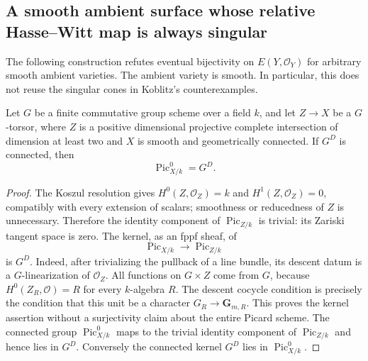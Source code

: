 \subsection{A smooth ambient surface whose relative Hasse--Witt map is always singular}
\label{subsec:relative-ordinarity-counterexample}

The following construction refutes eventual bijectivity on
$E(Y,\mathcal O_Y)$ for arbitrary smooth ambient varieties.  The
ambient variety is smooth.  In particular, this does not reuse the
singular cones in Koblitz's counterexamples.

\begin{lemma}\label{lem:picard-finite-quotient}
Let $G$ be a finite commutative group scheme over a field $k$, and
let $Z\to X$ be a $G$-torsor, where $Z$ is a positive dimensional
projective complete intersection of dimension at least two and $X$
is smooth and geometrically connected.  If $G^D$ is connected, then
\[
 \operatorname{Pic}_{X/k}^0=G^D.
\]
\end{lemma}

\begin{proof}
The Koszul resolution gives $H^0(Z,\mathcal O_Z)=k$ and
$H^1(Z,\mathcal O_Z)=0$, compatibly with every extension of scalars;
smoothness or reducedness of $Z$ is unnecessary.  Therefore the
identity component of $\operatorname{Pic}_{Z/k}$ is trivial: its
Zariski tangent space is zero.  The kernel, as an fppf sheaf, of
\[
 \operatorname{Pic}_{X/k}\longrightarrow\operatorname{Pic}_{Z/k}
\]
is $G^D$.  Indeed, after trivializing the pullback of a line bundle,
its descent datum is a $G$-linearization of $\mathcal O_Z$.
All functions on $G\times Z$ come from $G$, because
$H^0(Z_R,\mathcal O)=R$ for every $k$-algebra $R$.  The descent
cocycle condition is precisely the condition that this unit be a
character $G_R\to\mathbf G_{m,R}$.  This proves the kernel assertion
without a surjectivity claim about the entire Picard scheme.
The connected group $\operatorname{Pic}_{X/k}^0$ maps to the trivial
identity component of $\operatorname{Pic}_{Z/k}$ and hence lies in
$G^D$.  Conversely the connected kernel $G^D$ lies in
$\operatorname{Pic}_{X/k}^0$.
\end{proof}

